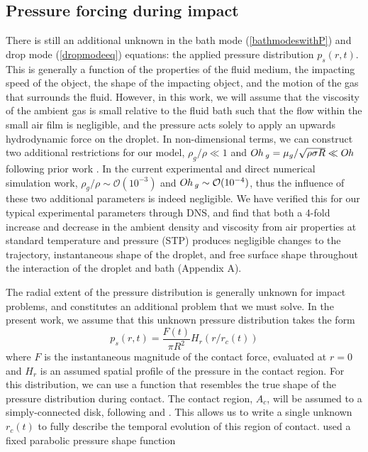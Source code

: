 \documentclass{jfm}
\begin{document}
\subsection{Pressure forcing during impact}
\label{subsec:modelPressure}
There is still an additional unknown in the bath mode (\ref{bathmodeswithP}) and drop mode (\ref{dropmodeeq}) equations: the applied pressure distribution $p_s(r,t)$. This is generally a function of the properties of the fluid medium, the impacting speed of the object, the shape of the impacting object, and the motion of the gas that surrounds the fluid. However, in this work, we will assume that the viscosity of the ambient gas is small relative to the fluid bath such that the flow within the small air film is negligible, and the pressure acts solely to apply an upwards hydrodynamic force on the droplet. In non-dimensional terms, we can construct two additional restrictions for our model, $\rho_g / \rho \ll 1$ and $O\kern-0.04em h\,_g = \mu_g / \sqrt{\rho \sigma R} \ll O\kern-0.04em h\,$ following prior work \citep{molavcek2012quasi}. In the current experimental and direct numerical simulation work, $\rho_g/ \rho \sim \mathcal{O}(10^{-3}) $ and $O\kern-0.04em h\,_g  \sim \mathcal{O}(10^{-4})$, thus the influence of these two additional parameters is indeed negligible.  We have verified this for our typical experimental parameters through DNS, and find that both a 4-fold increase and decrease in the ambient density and viscosity from air properties at standard temperature and pressure (STP) produces negligible changes to the trajectory, instantaneous shape of the droplet, and free surface shape throughout the interaction of the droplet and bath (Appendix A). 

The radial extent of the pressure distribution is generally unknown for impact problems, and constitutes an additional problem that we must solve. In the present work, we assume that this unknown pressure distribution takes the form 
\begin{equation}
    p_s(r,t) = \frac{F(t)}{\pi R^2} H_r(r/r_c(t)) \label{Presdef}
\end{equation}
where $F$ is the instantaneous magnitude of the contact force, evaluated at $r=0$ and $H_r$ is an assumed spatial profile of the pressure in the contact region.  For this distribution, we can use a function that resembles the true shape of the pressure distribution during contact. The contact region, $A_c$, will be assumed to a simply-connected disk, following \cite{galeano2017non} and \cite{korobkin1995impact}. This allows us to write a single unknown $r_c(t)$ to fully describe the temporal evolution of this region of contact. \cite{blanchette2016modeling,blanchette2017octahedra} used a fixed parabolic pressure shape function
\end{document}

